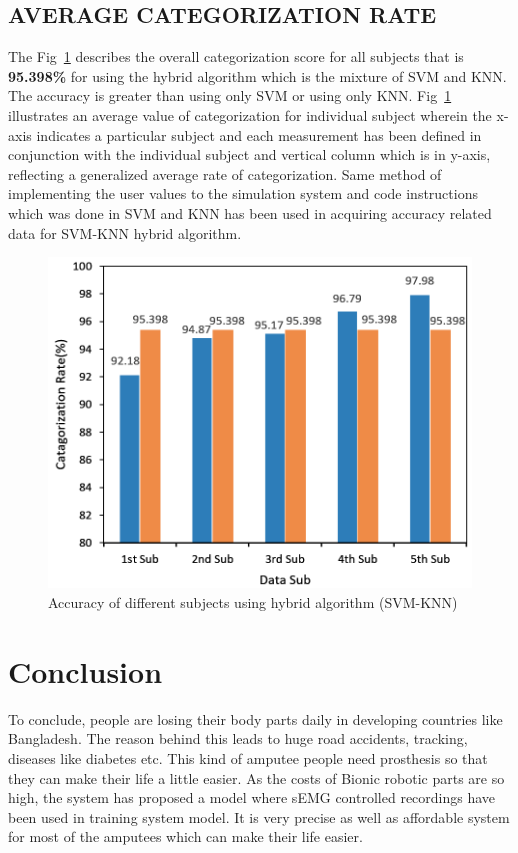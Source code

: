 \documentclass[conference]{IEEEtran}
\begin{document}
\subsection{AVERAGE CATEGORIZATION RATE } 
The Fig~\ref{fig:29} describes the overall categorization score for all subjects that is \textbf{95.398\%} for using the hybrid algorithm which is the mixture of SVM and KNN. The accuracy is greater than using only SVM or using only KNN. Fig~\ref{fig:29} illustrates an average value of categorization for individual subject wherein the x-axis indicates a particular subject and each measurement has been defined in conjunction with the individual subject and vertical column which is in y-axis, reflecting a generalized average rate of categorization. Same method of implementing the user values to the simulation system and code instructions which was done in SVM and KNN has been used in acquiring accuracy related data for SVM-KNN hybrid algorithm.
\begin{figure}[htbp]
 \centerline{\includegraphics[scale=0.5]{ne dhappa 2.PNG}}
 \caption{Accuracy of different subjects using hybrid algorithm (SVM-KNN)}
  \label{fig:29}
\end{figure} 

\newpage
\section{Conclusion}
To conclude, people are losing their body parts daily in developing countries like
Bangladesh. The reason behind this leads to huge road accidents, tracking, diseases like diabetes etc. This kind of amputee people need prosthesis so that they can make their life a little easier. As the costs of Bionic robotic parts are so high, the system has proposed a model where sEMG controlled recordings have been used in training system model. It is very precise as well as affordable system for most of the amputees which can make their life easier.\\




\end{document}
